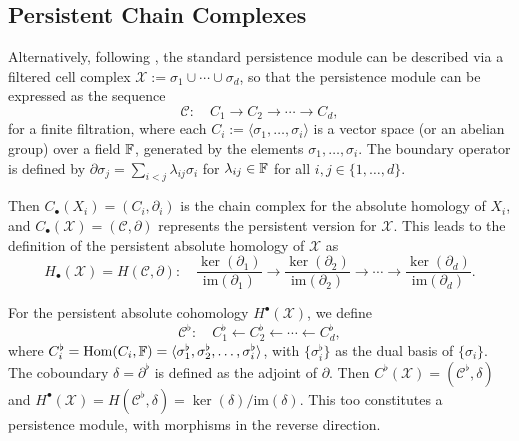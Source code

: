 \subsection{Persistent Chain Complexes}
Alternatively, following \cite[\S 2.6]{de2011dualities}, the standard persistence module
can be described via a filtered cell complex $\mathcal{X}:= \sigma_{1} \cup \cdots
\cup \sigma_{d}$, so that the persistence module can be expressed as the
sequence
\[
	\mathcal{C}: \quad C_{1} \to C_{2} \to \cdots \to C_{d},
\]
for a finite filtration, where each $C_{i} := \langle \sigma_{1}, \ldots, \sigma_{i}
\rangle$ is a vector space (or an abelian group) over a field ${\mathbb{F}}$,
generated by the elements $\sigma_{1}, \ldots, \sigma_{i}$. The boundary operator
is defined by $\partial \sigma_{j} = \sum_{i<j}\lambda_{ij}\sigma_{i}$ for $\lambda
_{ij}\in {\mathbb{F}}$ for all $i, j \in \{1, \ldots, d\}$.

Then $C_{\bullet}(X_{i}) = (C_{i},\partial_{i})$ is the chain complex for the absolute
homology of $X_{i}$, and $C_{\bullet}(\mathcal{X}) = (\mathcal{C},\partial)$
represents the persistent version for $\mathcal{X}$. This leads to the definition
of the persistent absolute homology of $\mathcal{X}$ as
\[
	H_{\bullet}(\mathcal{X}) = H(\mathcal{C}, \partial): \quad \frac{\ker(\partial_{1})}{\text{im}(\partial_{1})}
	\to \frac{\ker(\partial_{2})}{\text{im}(\partial_{2})}\to \cdots \to \frac{\ker(\partial_{d})}{\text{im}(\partial_{d})}
	.
\]

For the persistent absolute cohomology $H^{\bullet}(\mathcal{X})$, we define
\[
	\mathcal{C}^{\flat}: \quad C^{\flat}_{1} \leftarrow C^{\flat}_{2} \leftarrow \cdots
	\leftarrow C^{\flat}_{d},
\]
where $C_{i}^{\flat} = \text{Hom}(C_{i}, {\mathbb{F}}) = \langle \sigma_{1}^{\flat}
, \sigma_{2}^{\flat}, \ldots, \sigma_{i}^{\flat} \rangle$, with
$\{\sigma_{i}^{\flat}\}$ as the dual basis of $\{\sigma_{i}\}$. The coboundary $\delta
= \partial^{\flat}$ is defined as the adjoint of $\partial$. Then
$C^{\flat}(\mathcal{X}) = (\mathcal{C}^{\flat}, \delta)$ and
$H^{\bullet}(\mathcal{X}) = H(\mathcal{C}^{\flat}, \delta) = \ker(\delta) / \text{im}
(\delta)$. This too constitutes a persistence module, with morphisms in the
reverse direction.

